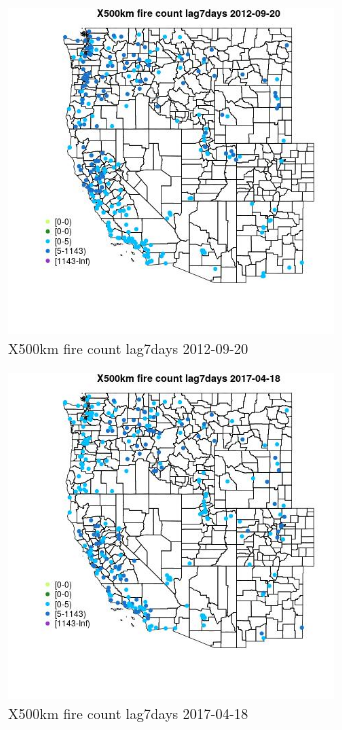 \begin{figure} 
\centering  
\includegraphics[width=0.77\textwidth]{Code_Outputs/Report_ML_input_PM25_Step4_part_e_de_duplicated_aves_compiled_2019-05-14wNAs_MapObsX500km_fire_count_lag7days2012-09-20.jpg} 
\caption{\label{fig:Report_ML_input_PM25_Step4_part_e_de_duplicated_aves_compiled_2019-05-14wNAsMapObsX500km_fire_count_lag7days2012-09-20}X500km fire count lag7days 2012-09-20} 
\end{figure} 
 

\begin{figure} 
\centering  
\includegraphics[width=0.77\textwidth]{Code_Outputs/Report_ML_input_PM25_Step4_part_e_de_duplicated_aves_compiled_2019-05-14wNAs_MapObsX500km_fire_count_lag7days2017-04-18.jpg} 
\caption{\label{fig:Report_ML_input_PM25_Step4_part_e_de_duplicated_aves_compiled_2019-05-14wNAsMapObsX500km_fire_count_lag7days2017-04-18}X500km fire count lag7days 2017-04-18} 
\end{figure} 
 

